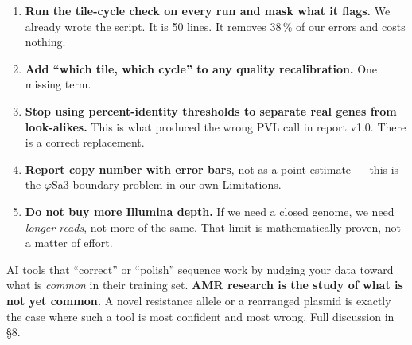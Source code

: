 \begin{dobox}[title={What to do about it --- five things, in order}]
\begin{enumerate}[label=\textbf{\arabic*.},leftmargin=1.7em]
\item \textbf{Run the tile-cycle check on every run and mask what it flags.} We already wrote the
  script. It is 50 lines. It removes 38\,\% of our errors and costs nothing. 
\item \textbf{Add ``which tile, which cycle'' to any quality recalibration.} One missing term.
\item \textbf{Stop using percent-identity thresholds to separate real genes from look-alikes.} This
  is what produced the wrong PVL call in report v1.0. There is a correct replacement. 
\item \textbf{Report copy number with error bars}, not as a point estimate --- this is the
  $\varphi$Sa3 boundary problem in our own Limitations. 
\item \textbf{Do not buy more Illumina depth.} If we need a closed genome, we need \emph{longer
  reads}, not more of the same. That limit is mathematically proven, not a matter of effort. 
\end{enumerate}
\end{dobox}

\begin{alertbox}[title={And one warning about AI}]
AI tools that ``correct'' or ``polish'' sequence work by nudging your data toward what is
\emph{common} in their training set. \textbf{AMR research is the study of what is not yet common.}
A novel resistance allele or a rearranged plasmid is exactly the case where such a tool is most
confident and most wrong. Full discussion in \S8.
\end{alertbox}
